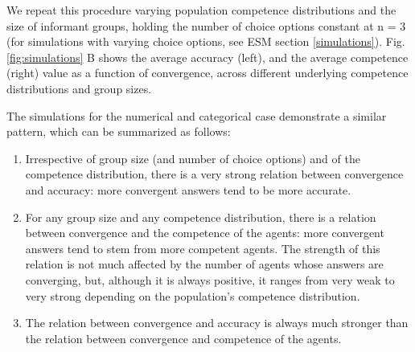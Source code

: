 \documentclass[
  doc,floatsintext]{apa6}
\providecommand{\tightlist}{%
  \setlength{\itemsep}{0pt}\setlength{\parskip}{0pt}}
\begin{document}
We repeat this procedure varying population competence distributions and the size of informant groups, holding the number of choice options constant at n = 3 (for simulations with varying choice options, see ESM section \ref{simulations}). Fig. \ref{fig:simulations} B shows the average accuracy (left), and the average competence (right) value as a function of convergence, across different underlying competence distributions and group sizes.

The simulations for the numerical and categorical case demonstrate a similar pattern, which can be summarized as follows:

\begin{enumerate}
\def\labelenumi{\arabic{enumi}.}
\tightlist
\item
  Irrespective of group size (and number of choice options) and of the competence distribution, there is a very strong relation between convergence and accuracy: more convergent answers tend to be more accurate.
\item
  For any group size and any competence distribution, there is a relation between convergence and the competence of the agents: more convergent answers tend to stem from more competent agents. The strength of this relation is not much affected by the number of agents whose answers are converging, but, although it is always positive, it ranges from very weak to very strong depending on the population's competence distribution.
\item
  The relation between convergence and accuracy is always much stronger than the relation between convergence and competence of the agents.
\end{enumerate}
\end{document}
